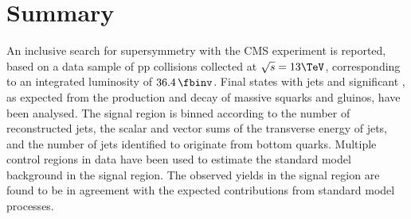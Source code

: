 \section{Summary}
\label{sec:summary}

An inclusive search for supersymmetry with the CMS experiment is
reported, based on a data sample of pp collisions collected at
$\sqrt{s} = 13\TeV$, corresponding to an integrated luminosity of $36.4\, \fbinv$. 
Final states with jets and significant \met, as
expected from the production and decay of massive squarks and gluinos,
have been analysed.  The signal region is binned according to the
number of reconstructed jets, the scalar and vector sums of the
transverse energy of jets, and the number of jets identified to
originate from bottom quarks. 
Multiple control regions in data have been used to estimate the standard model background in 
the signal region. 
The observed yields in the signal region are found to be in agreement with
the expected contributions from standard model processes. \\


